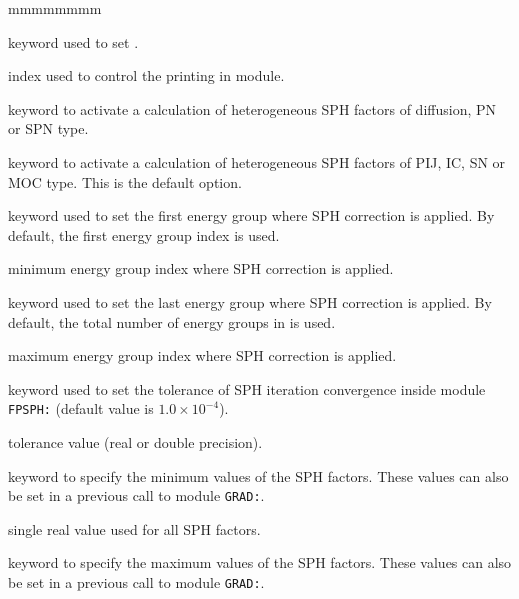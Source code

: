 \begin{ListeDeDescription}{mmmmmmmm}

\item[\moc{EDIT}] keyword used to set .

\item[\dusa{iprint}] index used to control the printing in module.

\item[\moc{PN}] keyword to activate a calculation of heterogeneous SPH factors of diffusion, PN or SPN type.

\item[\moc{SN}] keyword to activate a calculation of heterogeneous SPH factors of PIJ, IC, SN or MOC type.
This is the default option.

\item[\moc{GRPMIN}] keyword used to set the first energy group where SPH correction is applied. By default,
the first energy group index is used.

\item[\dusa{ngr1}] minimum energy group index where SPH correction is applied.

\item[\moc{GRPMAX}] keyword used to set the last energy group where SPH correction is applied. By default,
the total number of energy groups in  is used.

\item[\dusa{ngr2}] maximum energy group index where SPH correction is applied.

\item[\moc{OUT-STEP-EPS}] keyword used to set the tolerance of SPH iteration convergence inside module {\tt FPSPH:} (default value
is $1.0 \times 10^{-4}$).

\item[\dusa{$\epsilon_{ext}$}] tolerance value (real or double precision).

\item[\moc{VAR-VAL-MIN}] keyword to specify the minimum values of the SPH factors. These values can also be set in a previous call
to module {\tt GRAD:}.

\item[\dusa{varmin}] single real value used for all SPH factors.

\item[\moc{VAR-VAL-MAX}] keyword to specify the maximum values of the SPH factors. These values can also be set in a previous call
to module {\tt GRAD:}.


\end{ListeDeDescription}
